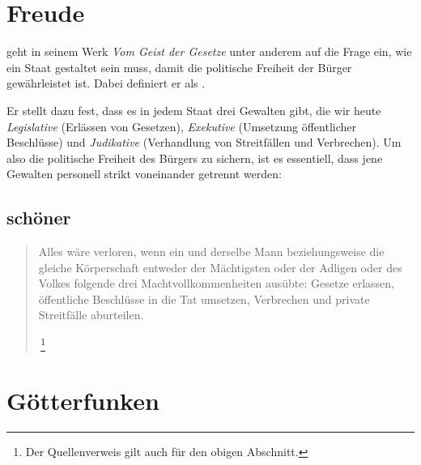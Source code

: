 \documentclass[%
    10pt,
    headinclude=false,
    footinclude=false,
    draft,
]{scrartcl}
\begin{document}
\tableofcontents

\section{Freude}

 geht in seinem Werk \emph{Vom Geist der
Gesetze} unter anderem auf die Frage ein, wie
ein Staat gestaltet sein muss, damit die politische Freiheit der
Bürger gewährleistet ist. Dabei definiert er 
als .

Er stellt dazu fest, dass es in jedem Staat drei Gewalten gibt, die
wir heute \emph{Legislative} (Erlässen von Gesetzen), \emph{Exekutive}
(Umsetzung öffentlicher Beschlüsse) und \emph{Judikative}
(Verhandlung von Streitfällen und Verbrechen). Um also die politische
Freiheit des Bürgers zu sichern, ist es essentiell, dass jene Gewalten
personell strikt voneinander getrennt werden:

\subsection{schöner}

\blockquote[{\,\footnote{Der
Quellenverweis gilt auch für den obigen Abschnitt.} }]{Alles wäre
verloren, wenn ein und derselbe Mann beziehungsweise die gleiche
Körperschaft entweder der Mächtigsten oder der Adligen oder des Volkes
folgende drei Machtvollkommenheiten ausübte: Gesetze erlassen,
öffentliche Beschlüsse in die Tat umsetzen, Verbrechen und private
Streitfälle aburteilen.}

\section{Götterfunken}
\end{document}
